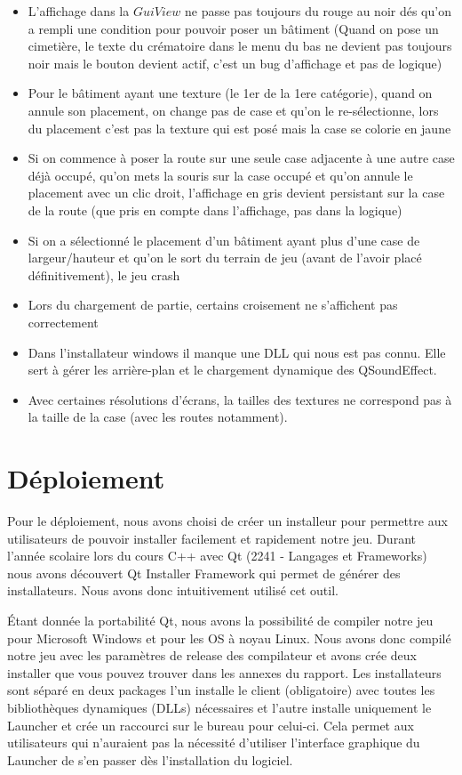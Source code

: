 \documentclass[a4paper,10pt,openany,oneside]{report}
\begin{document}
\begin{itemize}
\item L'affichage dans la $GuiView$ ne passe pas toujours du rouge au noir dés qu'on a rempli une condition pour pouvoir poser un bâtiment (Quand on pose un cimetière, le texte du crématoire dans le menu du bas ne devient pas toujours noir mais le bouton devient actif, c'est un bug d'affichage et pas de logique)
\item Pour le bâtiment ayant une texture (le 1er de la 1ere catégorie), quand on annule son placement, on change pas de case et qu'on le re-sélectionne, lors du placement c'est pas la texture qui est posé mais la case se colorie en jaune
\item Si on commence à poser la route sur une seule case adjacente à une autre case déjà occupé, qu'on mets la souris sur la case occupé et qu'on annule le placement avec un clic droit, l'affichage en gris devient persistant sur la case de la route (que pris en compte dans l'affichage, pas dans la logique)
\item Si on a sélectionné le placement d'un bâtiment ayant plus d'une case de largeur/hauteur et qu'on le sort du terrain de jeu (avant de l'avoir placé définitivement), le jeu crash
\item Lors du chargement de partie, certains croisement ne s'affichent pas correctement
\item Dans l'installateur windows il manque une DLL qui nous est pas connu. Elle sert à gérer les arrière-plan et le chargement dynamique des QSoundEffect.
\item Avec certaines résolutions d'écrans, la tailles des textures ne correspond pas à la taille de la case (avec les routes notamment).
\end{itemize}


\section{Déploiement}
Pour le déploiement, nous avons choisi de créer un installeur pour permettre aux utilisateurs de pouvoir installer  facilement et rapidement notre jeu. Durant l'année scolaire lors du cours C++ avec Qt (2241 - Langages et Frameworks) nous avons découvert Qt Installer Framework qui permet de générer des installateurs. Nous avons donc intuitivement utilisé cet outil.
\newline

Étant donnée la portabilité Qt, nous avons la possibilité de compiler notre jeu pour Microsoft Windows et pour les OS à noyau Linux. Nous avons donc compilé notre jeu avec les paramètres de release des compilateur et avons crée deux installer que vous pouvez trouver dans les annexes du rapport.
Les installateurs sont séparé en deux packages l'un installe le client (obligatoire) avec toutes les bibliothèques dynamiques (DLLs) nécessaires et l'autre installe uniquement le Launcher et crée un raccourci sur le bureau pour celui-ci.
Cela permet aux utilisateurs qui n'auraient pas la nécessité d'utiliser l'interface graphique du Launcher de s'en passer dès l'installation du logiciel.
\newline
\end{document}

